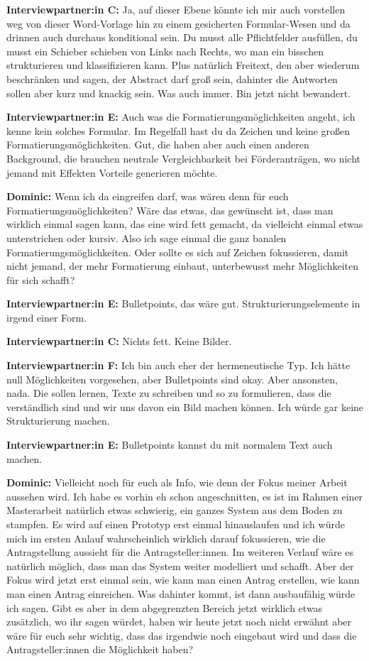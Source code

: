 \documentclass[a4paper,12pt,twoside]{scrreprt}
\begin{document}
\textbf{Interviewpartner:in C:} Ja, auf dieser Ebene könnte ich mir auch vorstellen weg von dieser Word-Vorlage hin zu einem gesicherten Formular-Wesen und da drinnen auch durchaus konditional sein. Du musst alle Pflichtfelder ausfüllen, du musst ein Schieber schieben von Links nach Rechts, wo man ein bisschen strukturieren und klassifizieren kann. Plus natürlich Freitext, den aber wiederum beschränken und sagen, der Abstract darf groß sein, dahinter die Antworten sollen aber kurz und knackig sein. Was auch immer. Bin jetzt nicht bewandert.

\textbf{Interviewpartner:in E:} Auch was die Formatierungsmöglichkeiten angeht, ich kenne kein solches Formular. Im Regelfall hast du da Zeichen und keine großen Formatierungsmöglichkeiten. Gut, die haben aber auch einen anderen Background, die brauchen neutrale Vergleichbarkeit bei Förderanträgen, wo nicht jemand mit Effekten Vorteile generieren möchte.

\textbf{Dominic:} Wenn ich da eingreifen darf, was wären denn für euch Formatierungsmöglichkeiten? Wäre das etwas, das gewünscht ist, dass man wirklich einmal sagen kann, das eine wird fett gemacht, da vielleicht einmal etwas unterstrichen oder kursiv. Also ich sage einmal die ganz banalen Formatierungsmöglichkeiten. Oder sollte es sich auf Zeichen fokussieren, damit nicht jemand, der mehr Formatierung einbaut, unterbewusst mehr Möglichkeiten für sich schafft?

\textbf{Interviewpartner:in E:} Bulletpoints, das wäre gut. Strukturierungselemente in irgend einer Form.

\textbf{Interviewpartner:in C:} Nichts fett. Keine Bilder.

\textbf{Interviewpartner:in F:} Ich bin auch eher der hermeneutische Typ. Ich hätte null Möglichkeiten vorgesehen, aber Bulletpoints sind okay. Aber ansonsten, nada. Die sollen lernen, Texte zu schreiben und so zu formulieren, dass die verständlich sind und wir uns davon ein Bild machen können. Ich würde gar keine Strukturierung machen.

\textbf{Interviewpartner:in E:} Bulletpoints kannst du mit normalem Text auch machen.

\textbf{Dominic:} Vielleicht noch für euch als Info, wie denn der Fokus meiner Arbeit aussehen wird. Ich habe es vorhin eh schon angeschnitten, es ist im Rahmen einer Masterarbeit natürlich etwas schwierig, ein ganzes System aus dem Boden zu stampfen. Es wird auf einen Prototyp erst einmal hinauslaufen und ich würde mich im ersten Anlauf wahrscheinlich wirklich darauf fokussieren, wie die Antragstellung aussieht für die Antragsteller:innen. Im weiteren Verlauf wäre es natürlich möglich, dass man das System weiter modelliert und schafft. Aber der Fokus wird jetzt erst einmal sein, wie kann man einen Antrag erstellen, wie kann man einen Antrag einreichen. Was dahinter kommt, ist dann ausbaufähig würde ich sagen. Gibt es aber in dem abgegrenzten Bereich jetzt wirklich etwas zusätzlich, wo ihr sagen würdet, haben wir heute jetzt noch nicht erwähnt aber wäre für euch sehr wichtig, dass das irgendwie noch eingebaut wird und dass die Antragsteller:innen die Möglichkeit haben?
\end{document}
